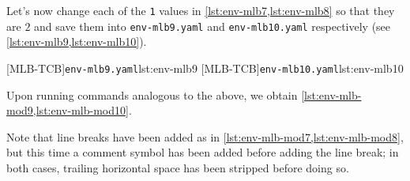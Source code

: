   \begin{example}
  Let's now change each of the \texttt{1} values in \cref{lst:env-mlb7,lst:env-mlb8} so
  that they are $2$ and save them into \texttt{env-mlb9.yaml} and \texttt{env-mlb10.yaml}
  respectively (see \cref{lst:env-mlb9,lst:env-mlb10}). 

  \begin{cmhtcbraster}
   [MLB-TCB]{\texttt{env-mlb9.yaml}}{lst:env-mlb9}
   [MLB-TCB]{\texttt{env-mlb10.yaml}}{lst:env-mlb10}
  \end{cmhtcbraster}

  Upon running commands analogous to the above, we obtain
  \cref{lst:env-mlb-mod9,lst:env-mlb-mod10}.

  \begin{widepage}
   \begin{minipage}{.43\linewidth}
   \end{minipage}
   \hfill
   \begin{minipage}{.56\linewidth}
   \end{minipage}
  \end{widepage}

  Note that line breaks have been added as in \cref{lst:env-mlb-mod7,lst:env-mlb-mod8}, but
  this time a comment symbol has been added before adding the line break; in both cases,
  trailing horizontal space has been stripped before doing so.
  \end{example}

